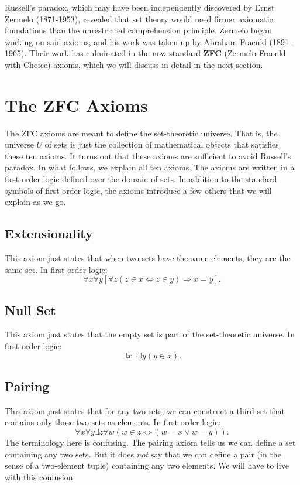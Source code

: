 \documentclass[11pt]{article}
\theoremstyle{definition}
\theoremstyle{remark}
\begin{document}
Russell's paradox, which may have been independently discovered by Ernst Zermelo (1871-1953), revealed that set theory would need firmer axiomatic foundations than the unrestricted comprehension principle. Zermelo began working on said axioms, and his work was taken up by Abraham Fraenkl (1891-1965). Their work has culminated in the now-standard \textbf{ZFC} (Zermelo-Fraenkl with Choice) axioms, which we will discuss in detail in the next section.\par 


\section{The ZFC Axioms}
The ZFC axioms are meant to define the set-theoretic universe. That is, the universe $U$ of sets is just the collection of mathematical objects that satisfies these ten axioms. It turns out that these axioms are sufficient to avoid Russell's paradox. In what follows, we explain all ten axioms. The axioms are written in a first-order logic defined over the domain of sets. In addition to the standard symbols of first-order logic, the axioms introduce a few others that we will explain as we go.

\subsection{Extensionality}
This axiom just states that when two sets have the same elements, they are the same set. In first-order logic: 
$$\forall x\forall y \left[\forall z (z\in x \iff z\in y)\Rightarrow x=y\right].$$

\subsection{Null Set}
This axiom just states that the empty set is part of the set-theoretic universe. In first-order logic:
$$\exists x \neg\exists y (y\in x).$$

\subsection{Pairing}
This axiom just states that for any two sets, we can construct a third set that contains only those two sets as elements. In first-order logic:
$$\forall x \forall y \exists z \forall w \left(w\in z \iff (w=x \vee w=y)\right).$$
The terminology here is confusing. The pairing axiom tells us we can define a set containing any two sets. But it does \textit{not} say that we can define a pair (in the sense of a two-element tuple) containing any two elements. We will have to live with this confusion.
\end{document}
